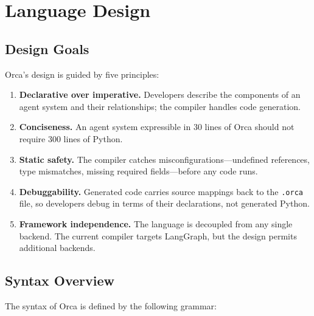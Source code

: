 \documentclass[sigconf,nonacm]{acmart}
\begin{document}
\section{Language Design}
\label{sec:language}

\subsection{Design Goals}
\label{sec:language:goals}

Orca's design is guided by five principles:

\begin{enumerate}[leftmargin=*]
  \item \textbf{Declarative over imperative.} Developers describe the
        components of an agent system and their relationships; the compiler
        handles code generation.
  \item \textbf{Conciseness.} An agent system expressible in 30 lines of
        Orca should not require 300 lines of Python.
  \item \textbf{Static safety.} The compiler catches misconfigurations---undefined
        references, type mismatches, missing required fields---before any
        code runs.
  \item \textbf{Debuggability.} Generated code carries source mappings back
        to the \texttt{.orca} file, so developers debug in terms of their
        declarations, not generated Python.
  \item \textbf{Framework independence.} The language is decoupled from any
        single backend. The current compiler targets LangGraph, but the
        design permits additional backends.
\end{enumerate}

\subsection{Syntax Overview}
\label{sec:language:syntax}

The syntax of Orca is defined by the following grammar:
\end{document}
